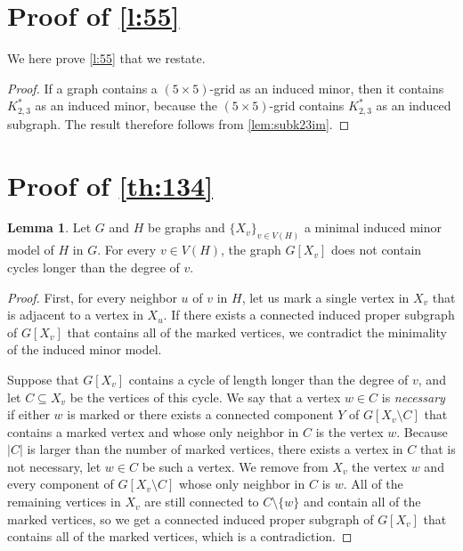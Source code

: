 \documentclass[11pt]{article}
\theoremstyle{definition}
\newtheorem{lemma}[theorem]{Lemma}
\theoremstyle{definition}
\begin{document}
\section{Proof of \cref{l:55}}
\label{sec:55}

We here prove \cref{l:55} that we restate. 

\lfivefive*

\begin{proof}
    If a graph contains a $(5\times 5)$-grid as an induced minor, then it contains $K_{2, 3}^*$ as an induced minor, because the $(5 \times 5)$-grid contains $K_{2, 3}^*$ as an induced subgraph.  The result therefore follows from \cref{lem:subk23im}. 
\end{proof}


\section{Proof of \cref{th:134}}
\label{sec:134}



\begin{lemma}
\label{lem:girthtree}
Let $G$ and $H$ be graphs and $\{X_v\}_{v \in V(H)}$ a minimal induced
minor model of $H$ in $G$.  For every $v \in V(H)$, the graph $G[X_v]$
does not contain cycles longer than the degree of $v$.
\end{lemma}
\begin{proof}
  First, for every neighbor $u$ of $v$ in $H$, let us mark a single
  vertex in $X_v$ that is adjacent to a vertex in $X_u$.  If
  there exists a connected induced proper subgraph of $G[X_v]$ that
  contains all of the marked vertices, we contradict the minimality of
  the induced minor model.


Suppose that $G[X_v]$ contains a cycle of length longer than the
degree of $v$, and let $C \subseteq X_v$ be the vertices of this
cycle.  We say that a vertex $w \in C$ is \emph{necessary} if either
$w$ is marked or there exists a connected component $Y$ of
$G[X_v \setminus C]$ that contains a marked vertex and whose only
neighbor in $C$ is the vertex $w$.  Because $|C|$ is larger than the
number of marked vertices, there exists a vertex in $C$ that is not
necessary, let $w \in C$ be such a vertex.  We remove from $X_v$ the
vertex $w$ and every component of $G[X_v \setminus C]$ whose only
neighbor in $C$ is $w$.  All of the remaining vertices in $X_v$ are
still connected to $C \setminus \{w\}$ and contain all of the marked
vertices, so we get a connected induced proper subgraph of $G[X_v]$
that contains all of the marked vertices, which is a contradiction.
\end{proof}
\end{document}
